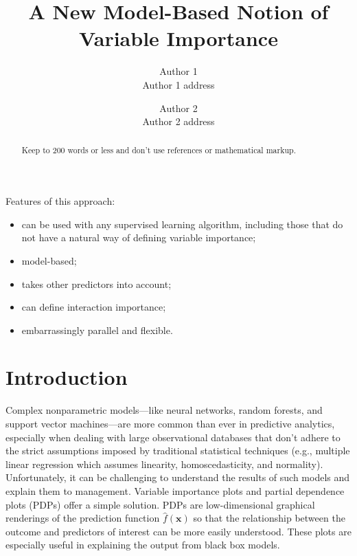 \documentclass{article}
\title{A New Model-Based Notion of Variable Importance}
\date{}
\author{Author 1\\ Author 1 address \and Author 2\\Author 2 address}
\begin{document}
\maketitle


\begin{abstract}
Keep to 200 words or less and don't use references or mathematical markup.
\end{abstract}


Features of this approach:
\begin{itemize}
  \item can be used with any supervised learning algorithm, including those that do not have a natural way of defining variable importance;
  \item model-based;
  \item takes other predictors into account;
  \item can define interaction importance;
  \item embarrassingly parallel and flexible.
\end{itemize}


\section{Introduction}

Complex nonparametric models---like neural networks, random forests, and support vector machines---are more common than ever in predictive analytics, especially when dealing with large observational databases that don't adhere to the strict assumptions imposed by traditional statistical techniques (e.g., multiple linear regression which assumes linearity, homoscedasticity, and normality). Unfortunately, it can be challenging to understand the results of such models and explain them to management. Variable importance plots and partial dependence plots (PDPs) offer a simple solution. PDPs are low-dimensional graphical renderings of the prediction function $\widehat{f}\left(\boldsymbol{x}\right)$ so that the relationship between the outcome and predictors of interest can be more easily understood. These plots are especially useful in explaining the output from black box models.
\end{document}
